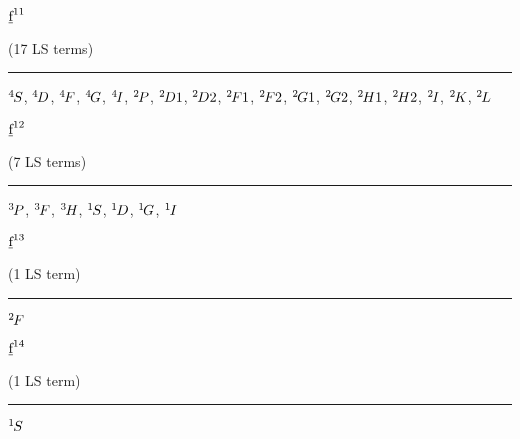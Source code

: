 \begin{mdframed}
\begin{center}
$\underbar{$\text{f}$}^{11}$

(17 LS terms)
\vspace{0.25cm}
\hrule
\vspace{0.25cm}

${}^{4}{\kern-0.1em}{S}$, ${}^{4}{\kern-0.1em}{D}$, ${}^{4}{\kern-0.1em}{F}$, ${}^{4}{\kern-0.1em}{G}$, ${}^{4}{\kern-0.1em}{I}$, ${}^{2}{\kern-0.1em}{P}$, ${}^{2}{\kern-0.1em}{D1}$, ${}^{2}{\kern-0.1em}{D2}$, ${}^{2}{\kern-0.1em}{F1}$, ${}^{2}{\kern-0.1em}{F2}$, ${}^{2}{\kern-0.1em}{G1}$, ${}^{2}{\kern-0.1em}{G2}$, ${}^{2}{\kern-0.1em}{H1}$, ${}^{2}{\kern-0.1em}{H2}$, ${}^{2}{\kern-0.1em}{I}$, ${}^{2}{\kern-0.1em}{K}$, ${}^{2}{\kern-0.1em}{L}$
\end{center}
\end{mdframed}

\begin{mdframed}
\begin{center}
$\underbar{$\text{f}$}^{12}$

(7 LS terms)
\vspace{0.25cm}
\hrule
\vspace{0.25cm}

${}^{3}{\kern-0.1em}{P}$, ${}^{3}{\kern-0.1em}{F}$, ${}^{3}{\kern-0.1em}{H}$, ${}^{1}{\kern-0.1em}{S}$, ${}^{1}{\kern-0.1em}{D}$, ${}^{1}{\kern-0.1em}{G}$, ${}^{1}{\kern-0.1em}{I}$
\end{center}
\end{mdframed}

\begin{mdframed}
\begin{center}
$\underbar{$\text{f}$}^{13}$

(1 LS term)
\vspace{0.25cm}
\hrule
\vspace{0.25cm}

${}^{2}{\kern-0.1em}{F}$
\end{center}
\end{mdframed}

\begin{mdframed}
\begin{center}
$\underbar{$\text{f}$}^{14}$

(1 LS term)
\vspace{0.25cm}
\hrule
\vspace{0.25cm}

${}^{1}{\kern-0.1em}{S}$
\end{center}
\end{mdframed}

